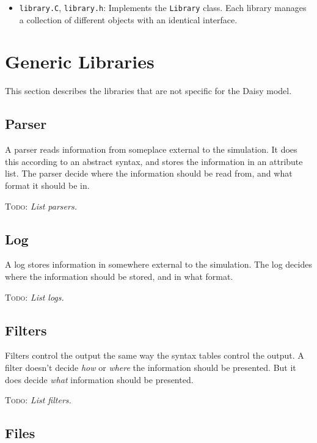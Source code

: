 \documentclass{article}
\newcommand{\code}[1]{\texttt{#1}}
\newcommand{\file}[1]{\texttt{#1}}
\newcommand{\todo}[1]{\textsc{Todo}: \textit{#1}}
\begin{document}
\begin{itemize}
\item \file{library.C}, \file{library.h}: Implements the
  \code{Library} class.  Each library manages a collection of
  different objects with an identical interface.
\end{itemize}

\section{Generic Libraries}

This section describes the libraries that are not specific for the
Daisy model.

\subsection{Parser}

A parser reads information from someplace external to the simulation.
It does this according to an abstract syntax, and stores the
information in an attribute list.  The parser decide where the
information should be read from, and what format it should be in.

\todo{List parsers.}

\subsection{Log}

A log stores information in somewhere external to the simulation.  The
log decides where the information should be stored, and in what
format.

\todo{List logs.}

\subsection{Filters}

Filters control the output the same way the syntax tables control the
output.  A filter doesn't decide \emph{how} or \emph{where} the
information should be presented.  But it does decide \emph{what}
information should be presented.

\todo{List filters.}

\subsection{Files}
\end{document}
